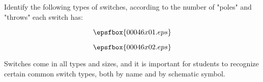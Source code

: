 

Identify the following types of switches, according to the number of "poles" and "throws" each switch has:

$$\epsfbox{00046x01.eps}$$







$$\epsfbox{00046x02.eps}$$







Switches come in all types and sizes, and it is important for students to recognize certain common switch types, both by name and by schematic symbol.




